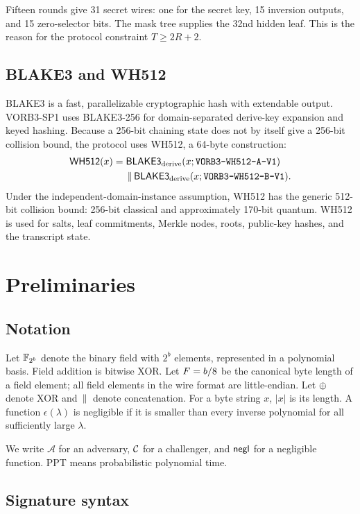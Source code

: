 \documentclass[11pt,a4paper]{article}
\begin{document}
Fifteen rounds give 31 secret wires: one for the secret key, 15 inversion
outputs, and 15 zero-selector bits. The mask tree supplies the 32nd hidden
leaf. This is the reason for the protocol constraint $T\ge 2R+2$.

\subsection{BLAKE3 and WH512}

BLAKE3 is a fast, parallelizable cryptographic hash with extendable output.
VORB3-SP1 uses BLAKE3-256 for domain-separated derive-key expansion and keyed
hashing. Because a 256-bit chaining state does not by itself give a 256-bit
collision bound, the protocol uses WH512, a 64-byte construction:
\begin{align*}
\mathsf{WH512}(x)={}&\mathsf{BLAKE3}_{\mathrm{derive}}(x;\texttt{VORB3-WH512-A-V1})\\
        &\,\|\,\mathsf{BLAKE3}_{\mathrm{derive}}(x;\texttt{VORB3-WH512-B-V1}).
\end{align*}
Under the independent-domain-instance assumption, WH512 has the generic
512-bit collision bound: 256-bit classical and approximately 170-bit quantum.
WH512 is used for salts, leaf commitments, Merkle nodes, roots, public-key
hashes, and the transcript state.

\section{Preliminaries}
\label{sec:prelim}

\subsection{Notation}

Let $\mathbb{F}_{2^{b}}$ denote the binary field with $2^b$ elements, represented in a
polynomial basis. Field addition is bitwise XOR. Let $F=b/8$ be the
canonical byte length of a field element; all field elements in the wire
format are little-endian. Let $\oplus$ denote XOR and $\,\|\,$ denote
concatenation. For a byte string $x$, $|x|$ is its length. A function
$\epsilon(\lambda)$ is negligible if it is smaller than every inverse
polynomial for all sufficiently large $\lambda$.

We write $\mathcal{A}$ for an adversary, $\mathcal{C}$ for a challenger, and
$\mathsf{negl}$ for a negligible function. PPT means probabilistic polynomial time.

\subsection{Signature syntax}
\end{document}
